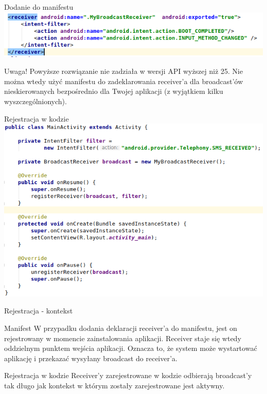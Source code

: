 \documentclass{beamer}
\begin{document}
\begin{frame}{Dodanie do manifestu}
	\includegraphics[width=\textwidth]{manifest}
	\begin{block}{Uwaga!}
		Powyższe rozwiązanie nie zadziała w wersji API wyższej niż 25. Nie można wtedy użyć manifestu do zadeklarowania receiver'a dla broadcast'ów nieskierowanych bezpośrednio dla Twojej aplikacji (z wyjątkiem kilku wyszczególnionych).
	\end{block}
\end{frame}

\begin{frame}{Rejestracja w kodzie}
	\centering
	\includegraphics[height=0.7\textheight]{code-registration}
\end{frame}

\begin{frame}{Rejestracja - kontekst}
	\begin{block}{Manifest}
		W przypadku dodania deklaracji receiver'a do manifestu, jest on rejestrowany w momencie zainstalowania aplikacji. Receiver staje się wtedy oddzielnym punktem wejścia aplikacji. Oznacza to, że system może wystartować aplikację i przekazać wysyłany broadcast do receiver'a.
	\end{block}
	\begin{block}{Rejestracja w kodzie}
		Receiver'y zarejestrowane w kodzie odbierają broadcast'y tak długo jak kontekst w którym zostały zarejestrowane jest aktywny.
	\end{block}
\end{frame}
\end{document}

